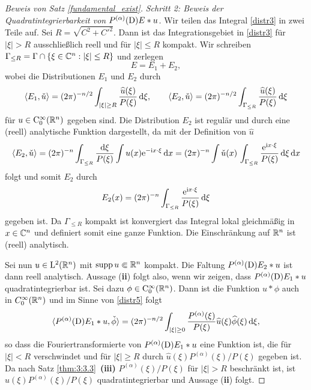 \begin{proof}[Beweis von Satz \ref{fundamental_exist}]
\medskip
\noindent
{\em Schritt 2: Beweis der Quadratintegrierbarkeit von $P^{(\alpha)}(\mathrm D) E * u$.}
Wir teilen das Integral \eqref{distr3} in zwei Teile auf. Sei $R=\sqrt{C^2 + C'^2}$. Dann ist das Integrationsgebiet in \eqref{distr3} für $|\xi|>R$ ausschließlich reell 
und für $|\xi|\le R$ kompakt. Wir schreiben $\Gamma_{\le R} = \Gamma\cap\{\xi\in\mathbb C^n : |\xi|\le R\}$ und zerlegen
\begin{equation}\label{distr4}
E=E_1 + E_2,
\end{equation}
wobei die Distributionen $E_1$ und $E_2$ durch
\begin{equation}\label{distr5}
\langle E_1,\check u\rangle = (2\pi)^{-n/2} \int_{|\xi|\ge R} \frac{\widehat u(\xi)}{P(\xi)}\,\mathrm d\xi, \qquad 
\langle E_2, \check u\rangle = (2\pi)^{-n/2} \int_{\Gamma_{\le R}} \frac{\widehat u(\xi)}{P(\xi)}\,\mathrm d \xi
\end{equation}
für $u\in\mathrm C_0^\infty(\mathbb R^n)$ gegeben sind. Die Distribution $E_2$ ist regulär und durch eine (reell) analytische 
Funktion dargestellt, da mit der Definition von $\widehat u$
\begin{equation}
\langle E_2, \check u\rangle = (2\pi)^{-n} \int_{\Gamma_{\le R}} \frac{\mathrm d\xi}{P(\xi)} \int u(x) \mathrm e^{-\mathrm i x\cdot\xi}\,\mathrm d x= (2\pi)^{-n} \int \check u(x) \, \int_{\Gamma_{\le R}}\frac{\mathrm e^{\mathrm i x\cdot \xi}}{P(\xi)}\,\mathrm d \xi \,\mathrm d x
\end{equation}
folgt und somit $E_2$ durch
\begin{equation}
 E_2(x) = (2\pi)^{-n} \int_{\Gamma_{\le R}} \frac{\mathrm e^{\mathrm i x\cdot \xi}}{P(\xi)}\,\mathrm d \xi
\end{equation}
gegeben ist. Da $\Gamma_{\le R}$ kompakt ist konvergiert das Integral lokal gleichmäßig in $x\in\mathbb C^n$ und definiert somit eine ganze Funktion. Die Einschränkung auf $\mathbb R^n$ ist (reell) analytisch. 

Sei nun $u\in \mathrm L^2(\mathbb R^n)$ mit $\operatorname{supp} u\Subset\mathbb R^n$ kompakt. Die Faltung $P^{(\alpha)}(\mathrm D)E_2 *u$ ist dann reell analytisch.  Aussage ({\bf ii}) folgt also, wenn wir zeigen, dass $P^{(\alpha)}(\mathrm D) E_1 * u$ quadratintegrierbar ist.  Sei  dazu $\phi \in\mathrm C_0^\infty(\mathbb R^n)$. Dann ist die Funktion $u*\phi$ auch in $C_0^\infty(\mathbb R^n)$ und im Sinne von \eqref{distr5} folgt
\begin{equation}
\langle P^{(\alpha)} (\D) E_1 * u, \check \phi\rangle  %
=(2\pi)^{-n/2} \int_{|\xi|\ge0} \frac{P^{(\alpha)}(\xi)}{P(\xi)} \widehat u(\xi) \widehat \phi(\xi) \d \xi,
\end{equation}     
so dass die Fouriertransformierte von $P^{(\alpha)}(\mathrm D) E_1 * u$ eine Funktion ist, die für $|\xi|<R$ verschwindet und für $|\xi|\ge R$ durch $\widehat u(\xi)P^{(\alpha)}(\xi)/P(\xi)$ gegeben ist. Da nach Satz \ref{thm:3:3.3}~{\bf (iii)} $P^{ (\alpha)}(\xi)/P(\xi)$ für $|\xi|>R$ beschränkt ist, ist  $\widehat u(\xi)P^{(\alpha)}(\xi)/P(\xi)$
quadratintegrierbar und Aussage ({\bf ii}) folgt.


\end{proof}
